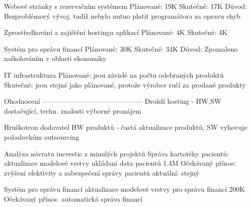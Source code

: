 \documentclass[11pt, a4paper, titlepage]{article}
\begin{document}
		Webové stránky s rezervačním systémem
			Plánované: 19K
			Skutečné: 17K
			Důvod: Bezproblémový vývoj, tudíž nebylo nutno platit programátora za opravu chyb

		Zprostředkování a zajištění hostingu aplikací
			Plánované: 4K
			Skutečné: 4K


		Systém pro správu financí
			Plánované: 30K
			Skutečné: 34K
			Důvod: Zpomaleno zaškolováním v oblasti ekonomiky

		IT infrastruktura
			Plánované: jsou závislé na počtu odebraných produktů
			Skutečné: jsou stejné jako plánované, protože výrobce ručí za prodané produkty

		Ohodnocení
		--------------------------------------------
		Droždí
			hosting - HW,SW dostačující, techn. znalosti výborné
			pronájem

		Hruškotron
			dodavatel HW produktů - častá aktualizace produktů, SW vyhovuje požadavkům
			outsourcing

		Analýza návratu incvestic z minulých projektů
			Správa kartotéky pacientů:
				aktualizace modelové vrstvy ukládaní data pacientů
				1.4M
				Očekávaný přínos: zvýšení efektivity a zabezpečení správy pacientů
				aktuální: stejný
		
			Systém pro správu financí
				aktualizace modelové vrstvy pro správu financí
				200K
				Očekávaný přínos. automatická správa financí
\end{document}
